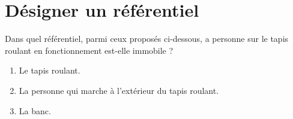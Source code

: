 \section{Désigner un référentiel}

Dans quel référentiel, parmi ceux proposés ci-dessous, a personne sur le tapis roulant en fonctionnement est-elle immobile ?
 
 \begin{enumerate}
 	\item Le tapis roulant.
 	\item La personne qui marche à l'extérieur du tapis roulant.
 	\item La banc. 
 \end{enumerate}

\fillwithdottedlines{2.5cm}